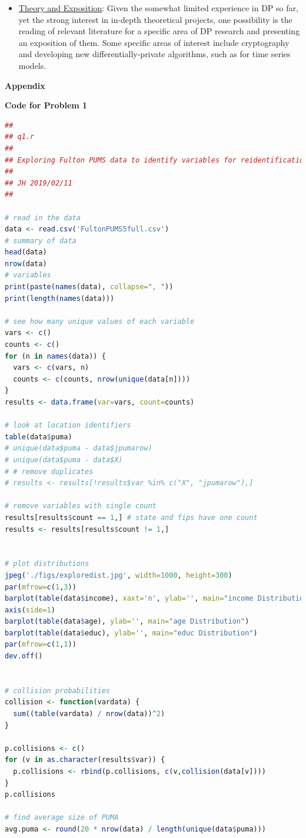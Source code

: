 \documentclass[12pt]{article}
\begin{document}
\begin{itemize}
	\item \ul{Theory and Exposition}: Given the somewhat limited experience in DP so far, yet the strong interest in in-depth theoretical projects, one possibility is the reading of relevant literature for a specific area of DP research and presenting an exposition of them. Some specific areas of interest include cryptography and developing new differentially-private algorithms, such as for time series models.
\end{itemize}




\pagebreak

{\large\textbf{Appendix}}

\textbf{Code for Problem 1}
\begin{lstlisting}[language=R]
##
## q1.r
##
## Exploring Fulton PUMS data to identify variables for reidentification attack 
##
## JH 2019/02/11
##

# read in the data
data <- read.csv('FultonPUMS5full.csv')
# summary of data
head(data)
nrow(data)
# variables
print(paste(names(data), collapse=", "))
print(length(names(data)))

# see how many unique values of each variable
vars <- c()
counts <- c()
for (n in names(data)) {
  vars <- c(vars, n)
  counts <- c(counts, nrow(unique(data[n])))
}
results <- data.frame(var=vars, count=counts)

# look at location identifiers
table(data$puma)
# unique(data$puma - data$jpumarow)
# unique(data$puma - data$X)
# # remove duplicates
# results <- results[!results$var %in% c("X", "jpumarow"),]

# remove variables with single count
results[results$count == 1,] # state and fips have one count
results <- results[results$count != 1,]


# plot distributions
jpeg('./figs/exploredist.jpg', width=1000, height=300)
par(mfrow=c(1,3))
barplot(table(data$income), xaxt='n', ylab='', main="income Distribution")
axis(side=1)
barplot(table(data$age), ylab='', main="age Distribution")
barplot(table(data$educ), ylab='', main="educ Distribution")
par(mfrow=c(1,1))
dev.off()


# collision probabilities
collision <- function(vardata) {
  sum((table(vardata) / nrow(data))^2)
}

p.collisions <- c()
for (v in as.character(results$var)) {
  p.collisions <- rbind(p.collisions, c(v,collision(data[v])))
}
p.collisions

# find average size of PUMA
avg.puma <- round(20 * nrow(data) / length(unique(data$puma)))


\end{lstlisting}
\end{document}
